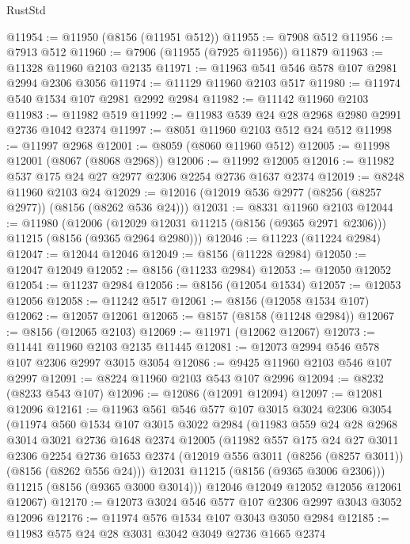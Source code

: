 \begin{lexlean}{RustStd}
\begin{coremodule}
{\begin{coremodule}
{{{{{{{{{{{{{{{{{{{{{{{{{{{{{{{{{{@11954 := @11950 (@8156 (@11951 @512))
@11955 := @7908 @512
@11956 := @7913 @512
@11960 := @7906 (@11955 (@7925 @11956)) @11879
@11963 := @11328 @11960 @2103 @2135
@11971 := @11963 @541 @546 @578 @107 @2981 @2994 @2306 @3056
@11974 := @11129 @11960 @2103 @517
@11980 := @11974 @540 @1534 @107 @2981 @2992 @2984
@11982 := @11142 @11960 @2103
@11983 := @11982 @519
@11992 := @11983 @539 @24 @28 @2968 @2980 @2991 @2736 @1042 @2374
@11997 := @8051 @11960 @2103 @512 @24 @512
@11998 := @11997 @2968
@12001 := @8059 (@8060 @11960 @512)
@12005 := @11998 @12001 (@8067 (@8068 @2968))
@12006 := @11992 @12005
@12016 := @11982 @537 @175 @24 @27 @2977 @2306 @2254 @2736 @1637 @2374
@12019 := @8248 @11960 @2103 @24
@12029 := @12016 (@12019 @536 @2977 (@8256 (@8257 @2977)) (@8156 (@8262 @536 @24)))
@12031 := @8331 @11960 @2103
@12044 := @11980
    (@12006 (@12029 @12031 @11215 (@8156 (@9365 @2971 @2306))) @11215 (@8156 (@9365 @2964 @2980)))
@12046 := @11223 (@11224 @2984)
@12047 := @12044 @12046
@12049 := @8156 (@11228 @2984)
@12050 := @12047 @12049
@12052 := @8156 (@11233 @2984)
@12053 := @12050 @12052
@12054 := @11237 @2984
@12056 := @8156 (@12054 @1534)
@12057 := @12053 @12056
@12058 := @11242 @517
@12061 := @8156 (@12058 @1534 @107)
@12062 := @12057 @12061
@12065 := @8157 (@8158 (@11248 @2984))
@12067 := @8156 (@12065 @2103)
@12069 := @11971 (@12062 @12067)
@12073 := @11441 @11960 @2103 @2135 @11445
@12081 := @12073 @2994 @546 @578 @107 @2306 @2997 @3015 @3054
@12086 := @9425 @11960 @2103 @546 @107 @2997
@12091 := @8224 @11960 @2103 @543 @107 @2996
@12094 := @8232 (@8233 @543 @107)
@12096 := @12086 (@12091 @12094)
@12097 := @12081 @12096
@12161 := @11963
    @561
    @546
    @577
    @107
    @3015
    @3024
    @2306
    @3054
    (@11974
      @560
      @1534
      @107
      @3015
      @3022
      @2984
      (@11983
        @559
        @24
        @28
        @2968
        @3014
        @3021
        @2736
        @1648
        @2374
        @12005
        (@11982
          @557
          @175
          @24
          @27
          @3011
          @2306
          @2254
          @2736
          @1653
          @2374
          (@12019 @556 @3011 (@8256 (@8257 @3011)) (@8156 (@8262 @556 @24)))
          @12031
          @11215
          (@8156 (@9365 @3006 @2306)))
        @11215
        (@8156 (@9365 @3000 @3014)))
      @12046
      @12049
      @12052
      @12056
      @12061
      @12067)
@12170 := @12073 @3024 @546 @577 @107 @2306 @2997 @3043 @3052 @12096
@12176 := @11974 @576 @1534 @107 @3043 @3050 @2984
@12185 := @11983 @575 @24 @28 @3031 @3042 @3049 @2736 @1665 @2374
}}}}}}}}}}}}}}}}}}}}}}}}}}}}}}}}}}
\end{coremodule}}
\end{coremodule}
\end{lexlean}
